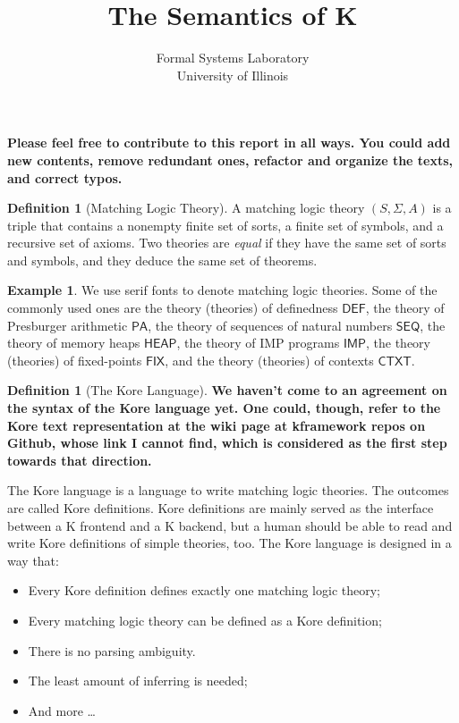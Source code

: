 \documentclass{article}
\title{The Semantics of K}
\author{Formal Systems Laboratory \\
          University of Illinois}
\newcommand{\comment}[1]
    {\par {\bfseries \color{blue} #1 \par}} %
\newcounter{thmcounter}
\theoremstyle{plain}
\theoremstyle{definition}
\newtheorem{definition}[thmcounter]{Definition}
\newtheorem{example}[thmcounter]{Example}
\theoremstyle{remark}
\newcommand{\PA}{\mathsf{PA}}
\newcommand{\SEQ}{\mathsf{SEQ}}
\newcommand{\HEAP}{\mathsf{HEAP}}
\newcommand{\IMP}{\mathsf{IMP}}
\newcommand{\FIX}{\mathsf{FIX}}
\newcommand{\CTXT}{\mathsf{CTXT}}
\newcommand{\DEF}{\mathsf{DEF}}
\begin{document}
\maketitle

\comment{Please feel free to contribute to this report in all ways. You could add new contents, remove redundant ones, refactor and organize the texts, and correct typos.} 

\begin{definition}[Matching Logic Theory]
\label{ML_theory}
A matching logic theory $(S, \Sigma, A)$ is a triple that contains a nonempty finite set of sorts, a finite set of symbols, and a recursive set of axioms. Two theories are \emph{equal} if they have the same set of sorts and symbols, and they deduce the same set of theorems.
\end{definition}

\begin{example}
We use {\sf serif fonts} to denote matching logic theories. Some of the commonly used ones are the theory (theories) of definedness $\DEF$, the theory of Presburger arithmetic $\PA$, the theory of sequences of natural numbers $\SEQ$, the theory of memory heaps $\HEAP$, the theory of {IMP} programs $\IMP$, the theory (theories) of fixed-points $\FIX$, and the theory (theories) of contexts $\CTXT$.
\end{example}


\begin{definition}[The Kore Language]
\comment{We haven't come to an agreement on the syntax of the Kore language yet. One could, though, refer to the Kore text representation at the wiki page at kframework repos on Github, whose link I cannot find, which is considered as the first step towards that direction.}
The Kore language is a language to write matching logic theories. The outcomes are called Kore definitions. Kore definitions are mainly served as the interface between a K frontend and a K backend, but a human should be able to read and write Kore definitions of simple theories, too. The Kore language is designed in a way that:
\begin{itemize}
\item Every Kore definition defines exactly one matching logic theory;
\item Every matching logic theory can be defined as a Kore definition;
\item There is no parsing ambiguity.
\item The least amount of inferring is needed;
\item And more \dots
\end{itemize}
\end{definition}
\end{document}
